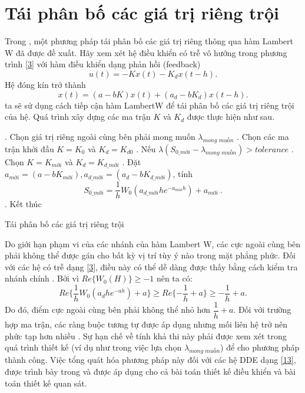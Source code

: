 \appendix

\section{Tái phân bố các giá trị riêng trội}
Trong \cite{t28}, một phương pháp tái phân bố các giá trị riêng thông qua hàm Lambert W đã được đề xuất. Hãy xem xét hệ điều khiển có trễ vô hướng trong phương trình \eqref{3} với hàm điều khiển dạng phản hồi (feedback)
$$u(t)=-Kx(t)-K_dx(t-h).$$
Hệ đóng kín trở thành
$$x(t)=(a-bK)x(t)+(a_d-bK_d)x(t-h).$$
ta sẽ sử dụng cách tiếp cận hàm LambertW để tái phân bố các giá trị riêng trội của hệ. Quá trình xây dựng các ma trận $K$ và $K_d$ được thực hiện như sau.

\begin{algorithm}
	\begin{algorithmic}
		. Chọn giá trị riêng ngoài cùng bên phải mong muốn $\lambda_{\textit{mong muốn}}$
		. Chọn các ma trận khởi đầu $K=K_0$ và $K_d=K_{d0}$ 
		. Nếu $\lambda(S_{0\_{\textit{mới}}}-\lambda_{\textit{mong muốn}})>\textit{tolerance}$ 
		. Chọn $K=K_{\textit{mới}}$ và $K_d=K_{d\_\textit{mới}}$ 
		. Đặt $a_{\textit{mới}}=(a-bK_{\textit{mới}}), a_{d\_\textit{mới}}=(a_d-bK_{d\_\textit{mới}})$, tính \[
		S_{0\_\textit{mới}}=\dfrac{1}{h}W_0(a_{d\_\textit{mới}}he^{-a_{\textit{mới}}h})+a_{\textit{mới}} \ . 
		\]
		. Kết thúc 
	\end{algorithmic}
	\caption{Tái phân bố các giá trị riêng trội}	
	\label{Alg1}
\end{algorithm}

\noindent Do giới hạn phạm vi của các nhánh của hàm Lambert W, các cực ngoài cùng bên phải không thể được gán cho bất kỳ vị trí tùy ý nào trong mặt phẳng phức. Đối với các hệ có trễ dạng \eqref{3}, điều này có thể dễ dàng được thấy bằng cách kiểm tra nhánh chính \cite{t27}. Bởi vì $Re\{W_0(H)\}\geq -1$ nên ta có:
$$Re\{\dfrac{1}{h}W_0(a_dhe^{-ah})+a\}\geq Re\{-\dfrac{1}{h}+a\}\geq -\dfrac{1}{h}+a.$$
Do đó, điểm cực ngoài cùng bên phải không thể nhỏ hơn $\dfrac{1}{h}+a$. Đối với trường hợp ma trận, các ràng buộc tương tự được áp dụng nhưng mối liên hệ trở nên phức tạp hơn nhiều . Sự hạn chế về tính khả thi này phải được xem xét trong quá trình thiết kế (ví dụ như trong việc lựa chọn $\lambda_{\textit{mong muốn}}$) để cho phương pháp thành công. Việc tổng quát hóa phương pháp này đối với các hệ DDE dạng \eqref{13}, được trình bày trong \cite{t27,t28} và được áp dụng cho cả bài toán thiết kế điều khiển và bài toán thiết kế quan sát.


